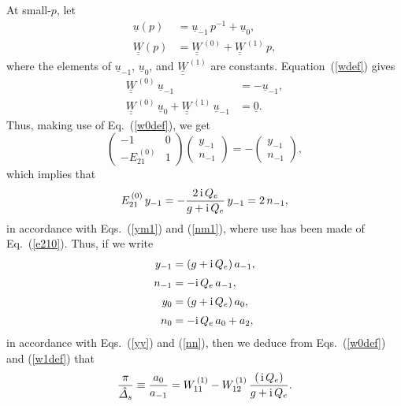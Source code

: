 \documentclass[12pt,prb,aps,notitlepage]{revtex4-1}
\begin{document}
At small-$p$, let
\begin{align}
\underline{u}(p) &= \underline{u}_{-1}\,p^{-1} + \underline{u}_0,\\[0.5ex]
\underline{\underline{W}}(p) &= \underline{\underline{W}}^{\,(0)} + \underline{\underline{W}}^{\,(1)} \,p,
\end{align}
where the elements of  $\underline{u}_{-1}$, $\underline{u}_0$, and $\underline{\underline{W}}^{\,(1)}$ are constants.
Equation~(\ref{wdef}) gives 
\begin{align}
\underline{\underline{W}}^{\,(0)}\,\underline{u}_{-1} &= - \underline{u}_{-1},\\[0.5ex]
\underline{\underline{W}}^{\,(0)}\,\underline{u}_{0} + \underline{\underline{W}}^{\,(1)}\,\underline{u}_{-1} &=\underline{0}.\label{w1def}
\end{align}
Thus, making use of Eq.~(\ref{w0def}), we get
\begin{equation}
\left(\begin{array}{cc} -1&0\\ -E_{21}^{\,(0)}&1\end{array}\right) \left(\begin{array}{c}y_{-1}\\ n_{-1}\end{array}\right)= -\left(\begin{array}{c}y_{-1}\\ n_{-1}\end{array}\right),
\end{equation}
which implies that
\begin{equation}
E_{21}^{\,(0)}\,y_{-1}= - \frac{2\,{\rm i}\,Q_e}{g+{\rm i}\,Q_e}\,y_{-1} = 2\,n_{-1},
\end{equation}
in accordance with Eqs.~(\ref{ym1}) and (\ref{nm1}), where use has been made of Eq.~(\ref{e210}). 
Thus, if we write
\begin{align}
y_{-1} &= (g+{\rm i}\,Q_e)\,a_{-1},\\[0.5ex]
n_{-1}&= -{\rm i}\,Q_e\,a_{-1},\\[0.5ex]
y_0 &= (g+{\rm i}\,Q_e)\,a_0,\\[0.5ex]
n_0 &= -{\rm i}\,Q_e\,a_0 + a_2,
\end{align}
in accordance with Eqs.~(\ref{yy}) and (\ref{nn}), then we deduce from Eqs.~(\ref{w0def}) and (\ref{w1def}) that 
\begin{equation}
\frac{\pi}{\hat{\mit\Delta}_s}\equiv \frac{a_0}{a_{-1}} = W_{11}^{\,(1)} - W_{12}^{\,(1)}\,\frac{(\,{\rm i}\,Q_e)}{g+{\rm i}\, Q_e}.
\end{equation}
\end{document}
